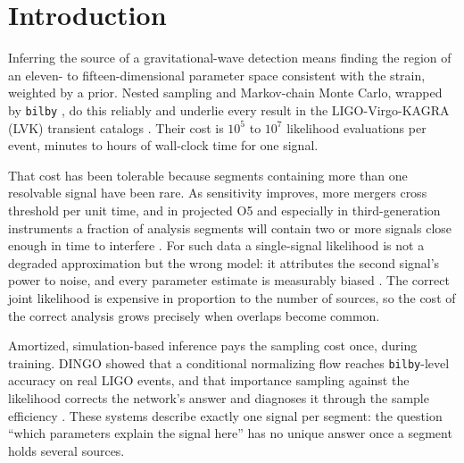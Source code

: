 \documentclass[twocolumn,linenumbers]{aastex701}
\begin{document}

\section{Introduction} \label{sec:intro}

Inferring the source of a gravitational-wave detection means finding the
region of an eleven- to fifteen-dimensional parameter space consistent with
the strain, weighted by a prior. Nested sampling
\citep{Skilling2004, Speagle2020Dynesty} and Markov-chain Monte Carlo, wrapped
by \texttt{bilby} \citep{Ashton2019Bilby, Romero2020Bilby2}, do this reliably
and underlie every result in the LIGO-Virgo-KAGRA (LVK) transient catalogs
\citep{Abbott2019GWTC1, Abbott2021GWTC2, Abbott2024GWTC21, Abbott2023GWTC3}.
Their cost is $10^5$ to $10^7$ likelihood evaluations per event, minutes to
hours of wall-clock time for one signal.

That cost has been tolerable because segments containing more than one
resolvable signal have been rare. As sensitivity improves, more mergers cross
threshold per unit time, and in projected O5 and especially in third-generation
instruments a fraction of analysis segments will contain two or more signals
close enough in time to interfere \citep{Antonelli2021Overlap,
Relton2021Overlap, Samajdar2021Global, Reali2023ET}. For such data a
single-signal likelihood is not a degraded approximation but the wrong model:
it attributes the second signal's power to noise, and every parameter estimate
is measurably biased \citep{Relton2021Overlap, Janquart2023Overlap}. The
correct joint likelihood is expensive in proportion to the number of sources,
so the cost of the correct analysis grows precisely when overlaps become
common.

Amortized, simulation-based inference pays the sampling cost once, during
training. DINGO \citep{Dax2021Dingo, Dax2021Gnpe, Wildberger2023Dingo,
Dax2023DingoBns} showed that a conditional normalizing flow reaches
\texttt{bilby}-level accuracy on real LIGO events, and that importance sampling
against the likelihood corrects the network's answer and diagnoses it through
the sample efficiency \citep{Dax2023DingoBns}. These systems describe exactly one signal per segment:
the question ``which parameters explain the signal here'' has no unique answer
once a segment holds several sources.
\end{document}
